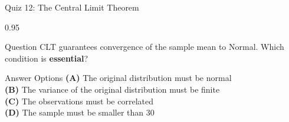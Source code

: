 \documentclass[9pt, aspectratio=169, t]{beamer}
\begin{document}
\begin{frame}{Quiz 12: The Central Limit Theorem}
\begin{cminipage}{0.95\textwidth}
    \begin{alertblock}{Question}
        CLT guarantees convergence of the sample mean to Normal. Which condition is \textbf{essential}?
    \end{alertblock}

    \vspace{0.5cm}
    \begin{block}{Answer Options}
    \textcolor{MainBlue}{\textbf{(A)}} The original distribution must be normal\\[3pt]
    \textcolor{MainBlue}{\textbf{(B)}} The variance of the original distribution must be finite\\[3pt]
    \textcolor{MainBlue}{\textbf{(C)}} The observations must be correlated\\[3pt]
    \textcolor{MainBlue}{\textbf{(D)}} The sample must be smaller than 30
    \end{block}
\end{cminipage}
\end{frame}
\end{document}
